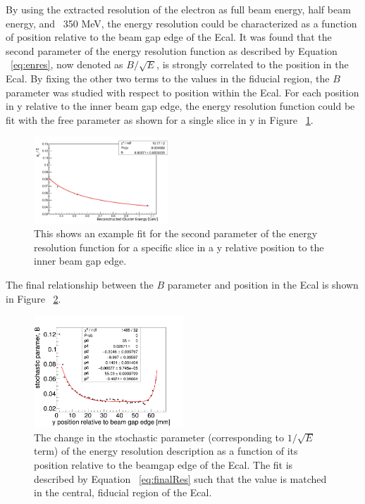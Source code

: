 \documentclass[twoside]{article}
\begin{document}
\begin{multicols}{2} 

By using the extracted resolution of the electron as full beam energy, half beam energy, and ~350 MeV, the energy resolution could be characterized as a function of position relative to the beam gap edge of the Ecal. It was found that the second parameter of the energy resolution function as described by Equation ~\eqref{eq:enres}, now denoted as $B/\sqrt{E}$, is strongly correlated to the position in the Ecal. By fixing the other two terms to the values in the fiducial region, the $B$ parameter was studied with respect to position within the Ecal. For each position in y relative to the inner beam gap edge, the energy resolution function could be fit with the free parameter as shown for a single slice in y in Figure ~\ref{sliceY}.

\begin{figure}[H]
  \centering
      \includegraphics[width=0.45\textwidth]{pics/examplebparfit3.pdf}
  \caption{This shows an example fit for the second parameter of the energy resolution function for a specific slice in a y relative position to the inner beam gap edge.}
  \label{sliceY}
\end{figure}

The final relationship between the $B$ parameter and position in the Ecal is shown in Figure ~\ref{BparRes}.
   
 \begin{figure}[H]
  \centering
      \includegraphics[width=0.5\textwidth]{pics/money.png}
  \caption{The change in the stochastic parameter (corresponding to $1/\sqrt{E}$ term) of the energy resolution description as a function of its position relative to the beamgap edge of the Ecal. The fit is described by Equation ~\ref{eq:finalRes} such that the value is matched in the central, fiducial region of the Ecal.}
  \label{BparRes}
\end{figure}
 

\end{multicols}
\end{document}
